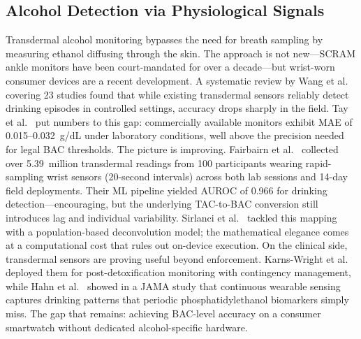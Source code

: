 \documentclass[HARVARD,Times2COL]{WileyNJDv5} %
\begin{document}
\subsection{Alcohol Detection via Physiological Signals}
Transdermal alcohol monitoring bypasses the need for breath sampling by measuring ethanol diffusing through the skin. The approach is not new---SCRAM ankle monitors have been court-mandated for over a decade---but wrist-worn consumer devices are a recent development. A systematic review by Wang et al.~\citep{wang2022jmir} covering 23 studies found that while existing transdermal sensors reliably detect drinking episodes in controlled settings, accuracy drops sharply in the field. Tay et al.~\citep{tay2023} put numbers to this gap: commercially available monitors exhibit MAE of 0.015--0.032~g/dL under laboratory conditions, well above the precision needed for legal BAC thresholds.
The picture is improving. Fairbairn et al.~\citep{fairbairn2025} collected over 5.39~million transdermal readings from 100 participants wearing rapid-sampling wrist sensors (20-second intervals) across both lab sessions and 14-day field deployments. Their ML pipeline yielded AUROC of 0.966 for drinking detection---encouraging, but the underlying TAC-to-BAC conversion still introduces lag and individual variability. Sirlanci et al.~\citep{sirlanci2019} tackled this mapping with a population-based deconvolution model; the mathematical elegance comes at a computational cost that rules out on-device execution.
On the clinical side, transdermal sensors are proving useful beyond enforcement. Karns-Wright et al.~\citep{karns-wright2025} deployed them for post-detoxification monitoring with contingency management, while Hahn et al.~\citep{hahn2023} showed in a JAMA study that continuous wearable sensing captures drinking patterns that periodic phosphatidylethanol biomarkers simply miss. The gap that remains: achieving BAC-level accuracy on a consumer smartwatch without dedicated alcohol-specific hardware.
\end{document}
